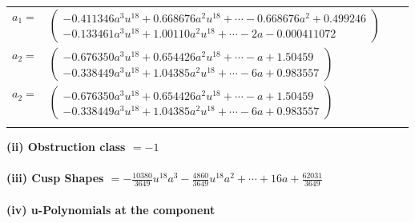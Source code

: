 \documentclass[1p]{elsarticle_modified}
\theoremstyle{definition}
\begin{document}
\begin{tabular}{m{7pt} m{180pt} m{7pt} m{180pt} }
\flushright $a_{1}=$&$\begin{pmatrix}-0.411346 a^{3} u^{18}+0.668676 a^{2} u^{18}+\cdots-0.668676 a^{2}+0.499246\\-0.133461 a^{3} u^{18}+1.00110 a^{2} u^{18}+\cdots-2 a-0.000411072\end{pmatrix}$ \\
\flushright $a_{2}=$&$\begin{pmatrix}-0.676350 a^{3} u^{18}+0.654426 a^{2} u^{18}+\cdots-a+1.50459\\-0.338449 a^{3} u^{18}+1.04385 a^{2} u^{18}+\cdots-6 a+0.983557\end{pmatrix}$\\ \flushright $a_{2}=$&$\begin{pmatrix}-0.676350 a^{3} u^{18}+0.654426 a^{2} u^{18}+\cdots-a+1.50459\\-0.338449 a^{3} u^{18}+1.04385 a^{2} u^{18}+\cdots-6 a+0.983557\end{pmatrix}$\\&\end{tabular}
\flushleft \textbf{(ii) Obstruction class $= -1$}\\~\\
\flushleft \textbf{(iii) Cusp Shapes $= -\frac{10380}{3649} u^{18} a^3-\frac{4860}{3649} u^{18} a^2+\cdots+16 a+\frac{62031}{3649}$}\\~\\
\newpage\renewcommand{\arraystretch}{1}
\flushleft \textbf{(iv) u-Polynomials at the component}\newline \\
\end{document}
